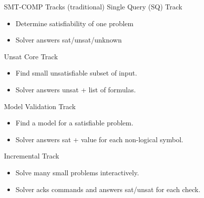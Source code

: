 \documentclass[table]{beamer}
\def\emph#1{\textcolor{MYblue}{#1}}
\begin{document}
\begin{frame}[fragile]{SMT-COMP Tracks (traditional)}
  \emph{Single Query (SQ) Track}
  \begin{itemize}
  \item Determine satisfiability of one problem
  \item Solver answers sat/unsat/unknown
  \end{itemize}
  \medskip

  \emph{Unsat Core Track}
  \begin{itemize}
  \item Find small unsatisfiable subset of input.
  \item Solver answers unsat + list of formulas.
  \end{itemize}
  \medskip

  \emph{Model Validation Track}
  \begin{itemize}
  \item Find a model for a satisfiable problem.
  \item Solver answers sat + value for each non-logical symbol.
  \end{itemize}
  \medskip

  \emph{Incremental Track}
  \begin{itemize}
  \item Solve many small problems interactively.
  \item Solver acks commands and answers sat/unsat for each check.
  \end{itemize}
\end{frame}
\end{document}
